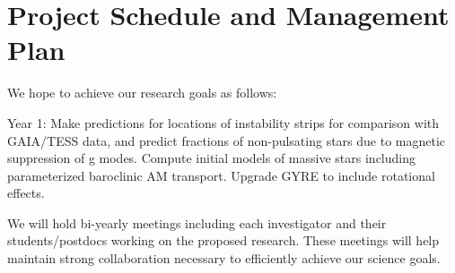 \section{Project Schedule and Management Plan}

We hope to achieve our research goals as follows:

Year 1: Make predictions for locations of instability strips for comparison with GAIA/TESS data, and predict fractions of non-pulsating stars due to magnetic suppression of g modes. Compute initial models of massive stars including parameterized baroclinic AM transport. Upgrade GYRE to include rotational effects. 

We will  hold bi-yearly meetings including each investigator and their students/postdocs working on the proposed research. These meetings will help maintain strong collaboration necessary to efficiently achieve our science goals.
